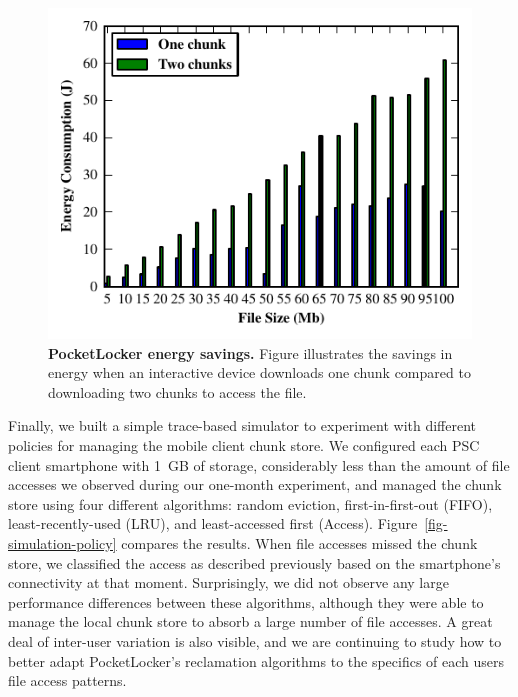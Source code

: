 \begin{figure}[t]

  \includegraphics{./figures/energysavings.pdf}

  \caption{\small \textbf{PocketLocker energy savings.} Figure illustrates
    the
    savings in energy when an interactive device downloads one chunk
    compared to
  downloading two chunks to access the file.}

  \label{fig-evaluation-energysavings}

\end{figure}


Finally, we built a simple trace-based simulator to experiment with different
policies for managing the mobile client chunk store. We configured each PSC
client smartphone with 1~GB of storage, considerably less than the amount of
file accesses we observed during our one-month experiment, and managed the
chunk store using four different algorithms: random eviction,
first-in-first-out (FIFO), least-recently-used (LRU), and least-accessed
first (Access). Figure~\ref{fig-simulation-policy} compares the results. When
file accesses missed the chunk store, we classified the access as described
previously based on the smartphone's connectivity at that moment.
Surprisingly, we did not observe any large performance differences between
these algorithms, although they were able to manage the local
chunk store to absorb a large number of file accesses. A great
deal of inter-user variation is also visible, and we are continuing to study
how to better adapt PocketLocker's reclamation algorithms to the specifics of
each users file access patterns.

